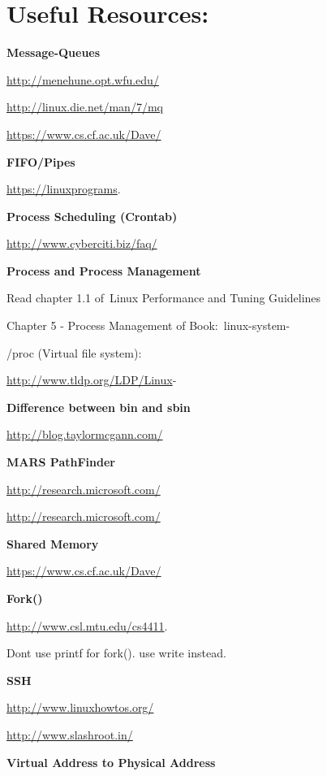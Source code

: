 \documentclass[letterpaper,10pt,english]{sphinxmanual}
\begin{document}
\section{Useful Resources:}
\label{week-02:useful-resources}
\textbf{Message-Queues}

\href{http://menehune.opt.wfu.edu/}{http://menehune.opt.wfu.edu/}

\href{http://linux.die.net/man/7/mq}{http://linux.die.net/man/7/mq}

\href{https://www.cs.cf.ac.uk/Dave/}{https://www.cs.cf.ac.uk/Dave/}

\textbf{FIFO/Pipes}

\href{https://linuxprograms}{https://linuxprograms}.

\textbf{Process Scheduling (Crontab)}

\href{http://www.cyberciti.biz/faq/}{http://www.cyberciti.biz/faq/}

\textbf{Process and Process Management}

Read chapter 1.1 of Linux Performance and Tuning Guidelines

Chapter 5 - Process Management of Book: linux-system-

/proc (Virtual file system):

\href{http://www.tldp.org/LDP/Linux}{http://www.tldp.org/LDP/Linux}-

\textbf{Difference between bin and sbin}

\href{http://blog.taylormcgann.com/}{http://blog.taylormcgann.com/}

\textbf{MARS PathFinder}

\href{http://research.microsoft.com/}{http://research.microsoft.com/}

\href{http://research.microsoft.com/}{http://research.microsoft.com/}

\textbf{Shared Memory}

\href{https://www.cs.cf.ac.uk/Dave/}{https://www.cs.cf.ac.uk/Dave/}

\textbf{Fork()}

\href{http://www.csl.mtu.edu/cs4411}{http://www.csl.mtu.edu/cs4411}.

Dont use printf for fork(). use write instead.

\textbf{SSH}

\href{http://www.linuxhowtos.org/}{http://www.linuxhowtos.org/}

\href{http://www.slashroot.in/}{http://www.slashroot.in/}

\textbf{Virtual Address to Physical Address}
\end{document}
